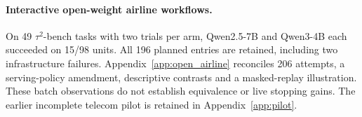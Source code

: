 \paragraph{Interactive open-weight airline workflows.}
On 49 $\tau^2$-bench tasks with two trials per arm, Qwen2.5-7B and
Qwen3-4B each succeeded on 15/98 units. All 196 planned entries are
retained, including two infrastructure failures. Appendix~\ref{app:open_airline}
reconciles 206 attempts, a serving-policy amendment, descriptive contrasts
and a masked-replay illustration. These batch observations do not establish
equivalence or live stopping gains. The earlier incomplete telecom pilot
is retained in Appendix~\ref{app:pilot}.
